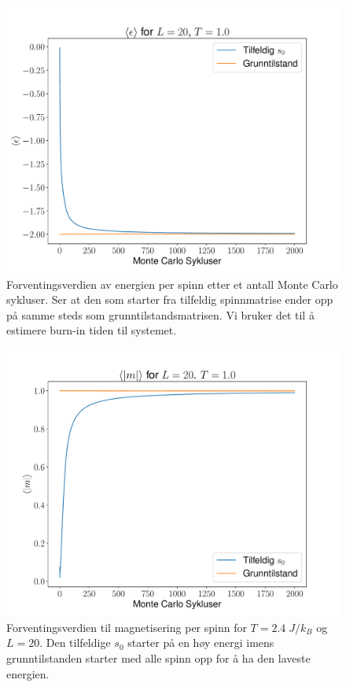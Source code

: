 \documentclass[reprint,english,notitlepage]{revtex4-2}  %
\begin{document}
\begin{figure}[H]
\centering
\includegraphics[scale=0.4, trim=1.7cm 0 0 0 ]{../Images/meanepsT1L20.pdf}
\caption{Forventingsverdien av energien per spinn etter et antall Monte Carlo sykluser. Ser at den som starter fra tilfeldig spinnmatrise ender opp på samme steds som grunntilstandsmatrisen. Vi bruker det til å estimere burn-in tiden til systemet.}
\label{Fig:5e1}
\end{figure}

\begin{figure}[H]
\centering
\includegraphics[scale=0.4, trim=2.5cm 0 0 0 ]{../Images/meanmT1L20.pdf}
\caption{Forventingsverdien til magnetisering per spinn for $T=2.4 \; J/k_B$ og $L=20$. Den tilfeldige $s_0$ starter på en høy energi imens grunntilstanden starter med alle spinn opp for å ha den laveste energien.}
\label{Fig:5m1}
\end{figure}
\end{document}
